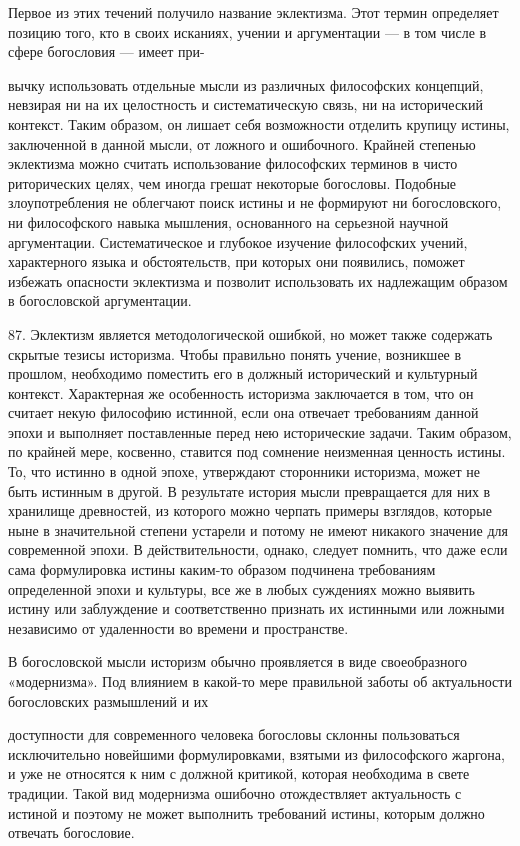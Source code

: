 \documentclass[a5paper,10pt]{article}
\begin{document}
Первое из этих течений получило название эклектизма. Этот термин определяет
позицию того, кто в своих исканиях, учении и аргументации — в том числе в сфере
богословия — имеет при-

вычку использовать отдельные мысли из различных философских концепций, невзирая
ни на их целостность и систематическую связь, ни на исторический контекст.
Таким образом, он лишает себя возможности отделить крупицу истины, заключенной
в данной мысли, от ложного и ошибочного. Крайней степенью эклектизма можно
считать использование философских терминов в чисто риторических целях, чем
иногда грешат некоторые богословы. Подобные злоупотребления не облегчают поиск
истины и не формируют ни богословского, ни философского навыка мышления,
основанного на серьезной научной аргументации. Систематическое и глубокое
изучение философских учений, характерного языка и обстоятельств, при которых
они появились, поможет избежать опасности эклектизма и позволит использовать их
надлежащим образом в богословской аргументации.

87. Эклектизм является методологической ошибкой, но может также содержать
скрытые тезисы историзма. Чтобы правильно понять учение, возникшее в прошлом,
необходимо поместить его в должный исторический и культурный контекст.
Характерная же особенность историзма заключается в том, что он считает некую
философию истинной, если она отвечает требованиям данной эпохи и выполняет
поставленные перед нею исторические задачи. Таким образом, по крайней мере,
косвенно, ставится под сомнение неизменная ценность истины. То, что истинно в
одной эпохе, утверждают сторонники историзма, может не быть истинным в другой.
В результате история мысли превращается для них в хранилище древностей, из
которого можно черпать примеры взглядов, которые ныне в значительной степени
устарели и потому не имеют никакого значение для современной эпохи. В
действительности, однако, следует помнить, что даже если сама формулировка
истины каким-то образом подчинена требованиям определенной эпохи и культуры,
все же в любых суждениях можно выявить истину или заблуждение и соответственно
признать их истинными или ложными независимо от удаленности во времени и
пространстве.

В богословской мысли историзм обычно проявляется в виде своеобразного
«модернизма». Под влиянием в какой-то мере правильной заботы об актуальности
богословских размышлений и их

доступности для современного человека богословы склонны пользоваться
исключительно новейшими формулировками, взятыми из философского жаргона, и уже
не относятся к ним с должной критикой, которая необходима в свете традиции.
Такой вид модернизма ошибочно отождествляет актуальность с истиной и поэтому не
может выполнить требований истины, которым должно отвечать богословие.
\end{document}
